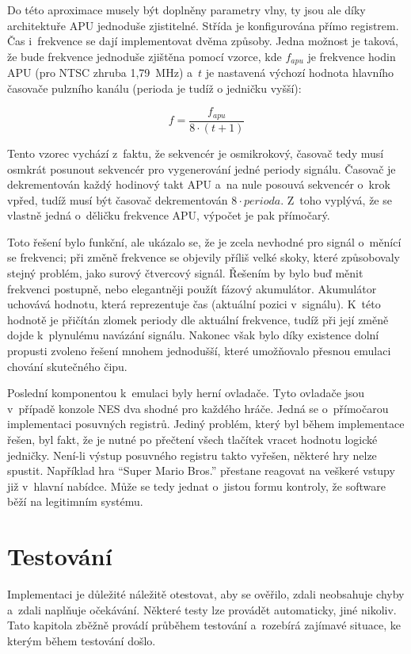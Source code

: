 Do této aproximace musely být doplněny parametry vlny, ty jsou ale díky architektuře APU jednoduše zjistitelné. Střída je konfigurována přímo registrem. Čas i~frekvence se dají implementovat dvěma způsoby. Jedna možnost je taková, že bude frekvence jednoduše zjištěna pomocí vzorce, kde $f_{apu}$ je frekvence hodin APU (pro NTSC zhruba 1,79~MHz) a~$t$ je nastavená výchozí hodnota hlavního časovače pulzního kanálu (perioda je tudíž o jedničku vyšší):

\[
	f = \frac{f_{apu}}{8 \cdot (t + 1)}
\]

Tento vzorec vychází z~faktu, že sekvencér je osmikrokový, časovač tedy musí osmkrát posunout sekvencér pro vygenerování jedné periody signálu. Časovač je dekrementován každý hodinový takt APU a~na nule posouvá sekvencér o~krok vpřed, tudíž musí být časovač dekrementován $8\cdot perioda$. Z~toho vyplývá, že se vlastně jedná o~děličku frekvence APU, výpočet je pak přímočarý.

Toto řešení bylo funkční, ale ukázalo se, že je zcela nevhodné pro signál o~měnící se frekvenci; při změně frekvence se objevily příliš velké skoky, které způsobovaly stejný problém, jako surový čtvercový signál. Řešením by bylo buď měnit frekvenci postupně, nebo elegantněji použít fázový akumulátor. Akumulátor uchovává hodnotu, která reprezentuje čas (aktuální pozici v~signálu). K~této hodnotě je přičítán zlomek periody dle aktuální frekvence, tudíž při její změně dojde k~plynulému navázání signálu. Nakonec však bylo díky existence dolní propusti zvoleno řešení mnohem jednodušší, které umožňovalo přesnou emulaci chování skutečného čipu.

Poslední komponentou k~emulaci byly herní ovladače. Tyto ovladače jsou v~případě konzole NES dva shodné pro každého hráče. Jedná se o~přímočarou implementaci posuvných registrů. Jediný problém, který byl během implementace řešen, byl fakt, že je nutné po přečtení všech tlačítek vracet hodnotu logické jedničky. Není-li výstup posuvného registru takto vyřešen, některé hry nelze spustit. Například hra \enquote{Super Mario Bros.} přestane reagovat na veškeré vstupy již v~hlavní nabídce. Může se tedy jednat o~jistou formu kontroly, že software běží na legitimním systému.

\chapter{Testování}
Implementaci je důležité náležitě otestovat, aby se ověřilo, zdali neobsahuje chyby a~zdali naplňuje očekávání. Některé testy lze provádět automaticky, jiné nikoliv. Tato kapitola zběžně provádí průběhem testování a~rozebírá zajímavé situace, ke kterým během testování došlo.

